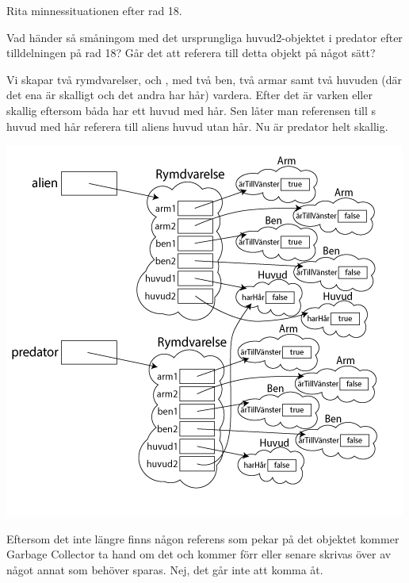 \Subtask\Pen Rita minnessituationen efter rad 18.

\Subtask\Pen Vad händer så småningom med det ursprungliga huvud2-objektet i predator efter tilldelningen på rad 18? Går det att referera till detta objekt på något sätt?


\SOLUTION


\TaskSolved \what


\SubtaskSolved  Vi skapar två rymdvarelser,  och , med två ben, två armar samt två huvuden (där det ena är skalligt och det andra har hår) vardera. Efter det är varken  eller  skallig eftersom båda har ett huvud med hår. Sen låter man referensen till s huvud med hår referera till aliens huvud utan hår. Nu är predator helt skallig.

\SubtaskSolved   \includegraphics[scale=0.7]{../img/w06-solutions/2b}

\SubtaskSolved  Eftersom det inte längre finns någon referens som pekar på det objektet kommer Garbage Collector ta hand om det och kommer förr eller senare skrivas över av något annat som behöver sparas. Nej, det går inte att komma åt.


\QUESTEND








